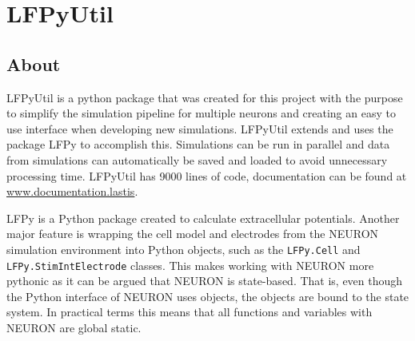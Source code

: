 \documentclass[altfont, fleqn]{uiophd}
\begin{document}




\section{LFPyUtil}
\subsection{About}
LFPyUtil is a python package that was created for this project with the purpose
to simplify the simulation pipeline for multiple neurons and creating
an easy to use interface when developing new simulations. 
LFPyUtil extends and uses the package LFPy to accomplish this. 
Simulations can be run in parallel and data from simulations can
automatically be saved and loaded to avoid unnecessary processing time.
LFPyUtil has 9000 lines of code, documentation can be found at
\url{www.documentation.lastis}. 


LFPy is a Python package created to calculate extracellular potentials.
Another major feature is wrapping the cell model and electrodes
from the NEURON simulation environment into Python objects, such as the 
\verb+LFPy.Cell+ and 
\verb+LFPy.StimIntElectrode+ classes.
This makes working with NEURON more pythonic as 
it can be argued that NEURON is
state-based.
That is, even though the Python interface of NEURON uses objects,
the objects are bound to the state system. 
In practical terms this means that all functions and variables
with NEURON are global static. 
\end{document}
